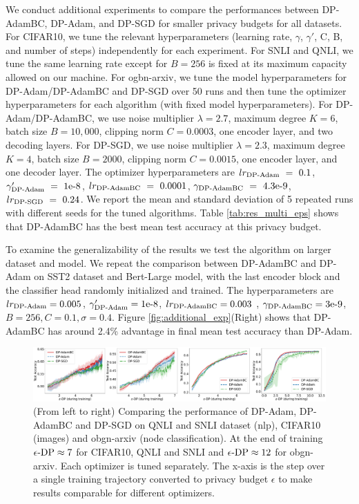 \documentclass[letterpaper]{article} %
\begin{document}
We conduct additional experiments to compare the performances between DP-AdamBC, DP-Adam, and DP-SGD for smaller privacy budgets for all datasets. For CIFAR10, we tune the relevant hyperparameters (learning rate, $\gamma$, $\gamma'$, C, B, and number of steps) independently for each experiment. For SNLI and QNLI, we tune the same learning rate except for $B=256$ is fixed at its maximum capacity allowed on our machine.
%
For ogbn-arxiv, we tune the model hyperparameters for DP-Adam/DP-AdamBC and DP-SGD over 50 runs and then tune the optimizer hyperparameters for each algorithm (with fixed model hyperparameters). For DP-Adam/DP-AdamBC, we use noise multiplier $\lambda = 2.7$, maximum degree $K = 6$, batch size $B = 10,000$, clipping norm $C = 0.0003$, one encoder layer, and two decoding layers. For DP-SGD, we use noise multiplier $\lambda = 2.3$, maximum degree $K = 4$, batch size $B = 2000$, clipping norm $C = 0.0015$, one encoder layer, and one decoder layer. The optimizer hyperparameters are $lr_{\textnormal{DP-Adam}}~=~0.1$, $\gamma'_{\textnormal{DP-Adam}}~=~1\textnormal{e-8}$, $lr_{\textnormal{DP-AdamBC}}~=~0.0001$, $\gamma_{\textnormal{DP-AdamBC}}~=~4.3\textnormal{e-9}$, $lr_{\textnormal{DP-SGD}}~=~0.24$. We report the mean and standard deviation of 5 repeated runs with different seeds for the tuned algorithms. Table \ref{tab:res_multi_eps} shows that DP-AdamBC has the best mean test accuracy at this privacy budget.

To examine the generalizability of the results we test the algorithm on larger dataset and model. We repeat the comparison between DP-AdamBC and DP-Adam on SST2 dataset and Bert-Large model, with the last encoder block and the classifier head randomly initialized and trained. The hyperparameters are $lr_{\textnormal{DP-Adam}} = 0.005$, $\gamma'_{\textnormal{DP-Adam}} = 1\textnormal{e-8}$, $lr_{\textnormal{DP-AdamBC}} = 0.003$ , $\gamma_{\textnormal{DP-AdamBC}} = 3\textnormal{e-9}$, $B=256, C=0.1, \sigma=0.4$. Figure \ref{fig:additional_exp}(Right) shows that DP-AdamBC has around 2.4\% advantage in final mean test accuracy than DP-Adam.

\begin{figure}[htb]
\centering
\includegraphics[width=\linewidth]{figs/main_res_reorganized_wide_modified_xaxis.pdf}
\caption{(From left to right) Comparing the performance of DP-Adam, DP-AdamBC and DP-SGD on QNLI and SNLI dataset (nlp), CIFAR10 (images) and obgn-arxiv (node classification). At the end of training $\epsilon\textnormal{-DP} \approx 7$ for CIFAR10, QNLI and SNLI and $\epsilon\textnormal{-DP} \approx 12$ for obgn-arxiv. Each optimizer is tuned separately. The x-axis is the step over a single training trajectory converted to privacy budget $\epsilon$ to make results comparable for different optimizers.}
\label{fig:exp1}
\end{figure}
\end{document}
